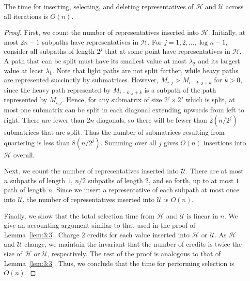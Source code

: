 \begin{theorem}
\label{thm:selection}
The time for inserting, selecting, and deleting representatives of $\mathcal{H}$ and $\mathcal{U}$ across all iterations is $O(n)$.
\end{theorem}
\begin{proof}
First, we count the number of representatives inserted into $\mathcal{H}$.
Initially, at most $2n-1$ subpaths have representatives in $\mathcal{H}$. 
For $j = 1, 2, \ldots,\log n - 1$, consider all subpaths of length $2^j$ that at some point have representatives in $\mathcal{H}$. 
A path that can be split must have its smallest value at most $\lambda_2$ and its largest value at least $\lambda_1$. 
Note that light paths are not split further, while heavy paths are represented succinctly by submatrices. 
However, $M_{i,j}>M_{i-k,j+k}$ for $k>0$, since the heavy path represented by $M_{i-k,j+k}$ is a subpath of the path represented by $M_{i,j}$. 
Hence, for any submatrix of size $2^j\times 2^j$ which is split, at most one submatrix can be split in each diagonal extending upwards from left to right. 
There are fewer than $2n$ diagonals, so there will be fewer than $2(n/2^j)$ submatrices that are split. 
Thus the number of submatrices resulting from quartering is less than $8(n/2^j)$. 
Summing over all $j$ gives $O(n)$ insertions into $\mathcal{H}$ overall.

Next, we count the number of representatives inserted into $\mathcal{U}$. 
There are at most $n$ subpaths of length $1$, $n/2$ subpaths of length $2$, and so forth, up to at most $1$ path of length $n$. 
Since we insert a representative of each subpath at most once into $\mathcal{U}$, the number of representatives inserted into $\mathcal{U}$ is $O(n)$.

Finally, we show that the total selection time from $\mathcal{H}$ and $\mathcal{U}$ is linear in $n$. 
We give an accounting argument similar to that used in the proof of Lemma~\ref{lem:3:3}. 
Charge $2$ credits for each value inserted into $\mathcal{H}$ or $\mathcal{U}$. 
As $\mathcal{H}$ and $\mathcal{U}$ change, we maintain the invariant that the number of credits is twice the size of $\mathcal{H}$ or $\mathcal{U}$, respectively. 
The rest of the proof is analogous to that of Lemma~\ref{lem:3:3}.
Thus, we conclude that the time for performing selection is $O(n)$.
\end{proof}

